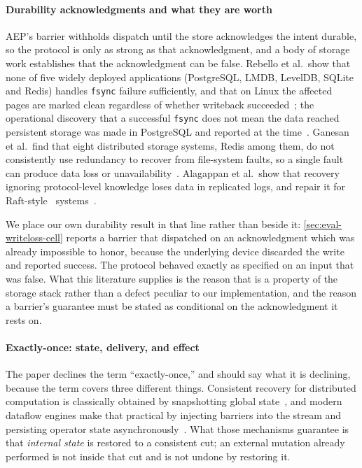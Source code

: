 \paragraph{Durability acknowledgments and what they are worth} AEP's barrier
withholds dispatch until the store acknowledges the intent durable, so the
protocol is only as strong as that acknowledgment, and a body of storage work
establishes that the acknowledgment can be false. Rebello et al.\ show that none
of five widely deployed applications (PostgreSQL, LMDB, LevelDB, SQLite and
Redis) handles \texttt{fsync} failure sufficiently, and that on Linux the
affected pages are marked clean regardless of whether writeback
succeeded~\cite{rebello2020fsync}; the operational discovery that a successful
\texttt{fsync} does not mean the data reached persistent storage was made in
PostgreSQL and reported at the time~\cite{corbet2018fsync}. Ganesan et al.\ find
that eight distributed storage systems, Redis among them, do not consistently use
redundancy to recover from file-system faults, so a single fault can produce data
loss or unavailability~\cite{ganesan2017redundancy}. Alagappan et al.\ show that
recovery ignoring protocol-level knowledge loses data in replicated logs, and
repair it for Raft-style~\cite{ongaro2014raft} systems~\cite{alagappan2018par}.

We place our own durability result in that line rather than beside it:
\cref{sec:eval-writeloss-cell} reports a barrier that dispatched on an
acknowledgment which
was already impossible to honor, because the underlying device discarded the
write and reported success. The protocol behaved exactly as specified on an input
that was false. What this literature supplies is the reason that is a property of
the storage stack rather than a defect peculiar to our implementation, and the
reason a barrier's guarantee must be stated as conditional on the acknowledgment
it rests on.

\paragraph{Exactly-once: state, delivery, and effect} The paper declines the term
``exactly-once,'' and should say what it is declining, because the term covers
three different things. Consistent recovery for distributed computation is
classically obtained by snapshotting global state~\cite{chandy1985snapshots}, and
modern dataflow engines make that practical by injecting barriers into the stream
and persisting operator state asynchronously~\cite{carbone2015abs}. What those
mechanisms guarantee is that \emph{internal state} is restored to a consistent
cut; an external mutation already performed is not inside that cut and is not
undone by restoring it.

